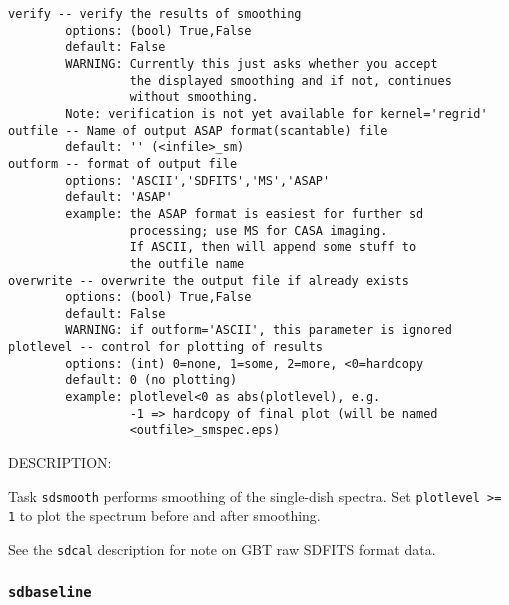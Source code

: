 \begin{verbatim}
verify -- verify the results of smoothing
        options: (bool) True,False
        default: False
        WARNING: Currently this just asks whether you accept
                 the displayed smoothing and if not, continues
                 without smoothing.
        Note: verification is not yet available for kernel='regrid'
outfile -- Name of output ASAP format(scantable) file
        default: '' (<infile>_sm)
outform -- format of output file
        options: 'ASCII','SDFITS','MS','ASAP'
        default: 'ASAP'
        example: the ASAP format is easiest for further sd
                 processing; use MS for CASA imaging.
                 If ASCII, then will append some stuff to
                 the outfile name
overwrite -- overwrite the output file if already exists
        options: (bool) True,False
        default: False
        WARNING: if outform='ASCII', this parameter is ignored
plotlevel -- control for plotting of results
        options: (int) 0=none, 1=some, 2=more, <0=hardcopy
        default: 0 (no plotting)
        example: plotlevel<0 as abs(plotlevel), e.g.
                 -1 => hardcopy of final plot (will be named
                 <outfile>_smspec.eps)
\end{verbatim}

    DESCRIPTION:

Task {\tt sdsmooth} performs smoothing of the single-dish spectra.
Set {\tt plotlevel >= 1} to plot the spectrum before and after smoothing.
    
See the {\tt sdcal} description for note on GBT raw SDFITS format data.

\medskip

 
\subsubsection{{\tt sdbaseline}}
\label{section:sd.sdtasks.tasks.sdbaseline}

